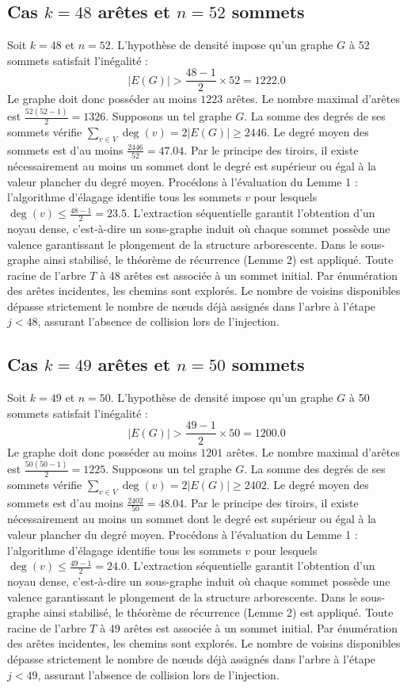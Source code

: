 \documentclass[12pt,a4paper]{article}
\begin{document}
\subsection{Cas $k = 48$ arêtes et $n = 52$ sommets}
Soit $k = 48$ et $n = 52$. L'hypothèse de densité impose qu'un graphe $G$ à 52 sommets satisfait l'inégalité :
$$ |E(G)| > \frac{48-1}{2} \times 52 = 1222.0 $$
Le graphe doit donc posséder au moins $1223$ arêtes. Le nombre maximal d'arêtes est $\frac{52(52-1)}{2} = 1326$.
Supposons un tel graphe $G$. La somme des degrés de ses sommets vérifie $\sum_{v \in V} \deg(v) = 2|E(G)| \geq 2446$.
Le degré moyen des sommets est d'au moins $\frac{2446}{52} = 47.04$.
Par le principe des tiroirs, il existe nécessairement au moins un sommet dont le degré est supérieur ou égal à la valeur plancher du degré moyen.
Procédons à l'évaluation du Lemme 1 : l'algorithme d'élagage identifie tous les sommets $v$ pour lesquels $\deg(v) \leq \frac{48-1}{2} = 23.5$.
L'extraction séquentielle garantit l'obtention d'un noyau dense, c'est-à-dire un sous-graphe induit où chaque sommet possède une valence garantissant le plongement de la structure arborescente.
Dans le sous-graphe ainsi stabilisé, le théorème de récurrence (Lemme 2) est appliqué. Toute racine de l'arbre $T$ à 48 arêtes est associée à un sommet initial. Par énumération des arêtes incidentes, les chemins sont explorés. Le nombre de voisins disponibles dépasse strictement le nombre de nœuds déjà assignés dans l'arbre à l'étape $j < 48$, assurant l'absence de collision lors de l'injection.

\subsection{Cas $k = 49$ arêtes et $n = 50$ sommets}
Soit $k = 49$ et $n = 50$. L'hypothèse de densité impose qu'un graphe $G$ à 50 sommets satisfait l'inégalité :
$$ |E(G)| > \frac{49-1}{2} \times 50 = 1200.0 $$
Le graphe doit donc posséder au moins $1201$ arêtes. Le nombre maximal d'arêtes est $\frac{50(50-1)}{2} = 1225$.
Supposons un tel graphe $G$. La somme des degrés de ses sommets vérifie $\sum_{v \in V} \deg(v) = 2|E(G)| \geq 2402$.
Le degré moyen des sommets est d'au moins $\frac{2402}{50} = 48.04$.
Par le principe des tiroirs, il existe nécessairement au moins un sommet dont le degré est supérieur ou égal à la valeur plancher du degré moyen.
Procédons à l'évaluation du Lemme 1 : l'algorithme d'élagage identifie tous les sommets $v$ pour lesquels $\deg(v) \leq \frac{49-1}{2} = 24.0$.
L'extraction séquentielle garantit l'obtention d'un noyau dense, c'est-à-dire un sous-graphe induit où chaque sommet possède une valence garantissant le plongement de la structure arborescente.
Dans le sous-graphe ainsi stabilisé, le théorème de récurrence (Lemme 2) est appliqué. Toute racine de l'arbre $T$ à 49 arêtes est associée à un sommet initial. Par énumération des arêtes incidentes, les chemins sont explorés. Le nombre de voisins disponibles dépasse strictement le nombre de nœuds déjà assignés dans l'arbre à l'étape $j < 49$, assurant l'absence de collision lors de l'injection.
\end{document}
